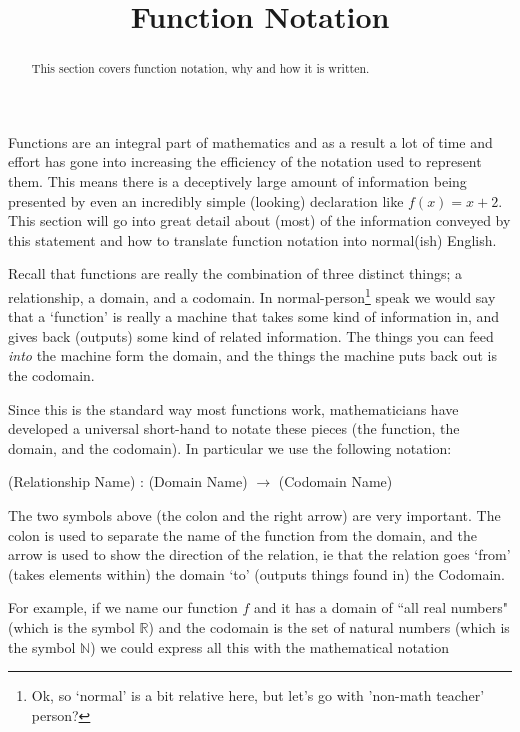 \documentclass{ximeraXloud}
\title{Function Notation}
\begin{document}
\begin{abstract}
    This section covers function notation, why and how it is written.
\end{abstract}
\maketitle

Functions are an integral part of mathematics and as a result a lot of time and effort has gone into increasing the efficiency of the notation used to represent them. This means there is a deceptively large amount of information being presented by even an incredibly simple (looking) declaration like $f(x) = x + 2$. This section will go into great detail about (most) of the information conveyed by this statement and how to translate function notation into normal(ish) English.

Recall that functions are really the combination of three distinct things; a relationship, a domain, and a codomain. In normal-person\footnote{
    Ok, so `normal' is a bit relative here, but let's go with 'non-math teacher' person?
        }
speak we would say that a `function' is really a machine that takes some kind of information in, and gives back (outputs) some kind of related information. The things you can feed \textit{into} the machine form the domain, and the things the machine puts back out is the codomain.

Since this is the standard way most functions work, mathematicians have developed a universal short-hand to notate these pieces (the function, the domain, and the codomain). In particular we use the following notation:

\begin{center}
    (Relationship Name) : (Domain Name) $\rightarrow$ (Codomain Name)
\end{center}

The two symbols above (the colon and the right arrow) are very important. The colon is used to separate the name of the function from the domain, and the arrow is used to show the direction of the relation, ie that the relation goes `from' (takes elements within) the domain `to' (outputs things found in) the Codomain.

For example, if we name our function $f$ and it has a domain of ``all real numbers" (which is the symbol $\mathbb{R}$) and the codomain is the set of natural numbers (which is the symbol $\mathbb{N}$) we could express all this with the mathematical notation
\end{document}
